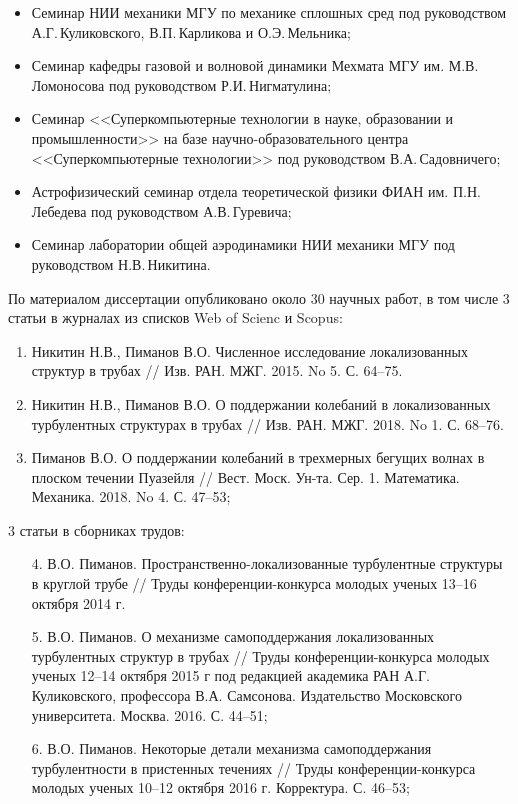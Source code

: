\begin{itemize}
\item Семинар НИИ механики МГУ по механике сплошных сред под руководством А.Г.\,Куликовского, В.П.\,Карликова и О.Э.\,Мельника;
\item Семинар кафедры газовой и волновой динамики Мехмата МГУ им. М.В. Ломоносова под руководством Р.И.\,Нигматулина;
\item Семинар <<Суперкомпьютерные технологии в науке, образовании и промышленности>> на базе научно-образовательного центра <<Суперкомпьютерные технологии>> под руководством В.А.\,Садовничего;
\item Астрофизический семинар отдела теоретической физики ФИАН им. П.Н.\,Лебедева под руководством А.В.\,Гуревича;
\item Семинар лаборатории общей аэродинамики НИИ механики МГУ под руководством Н.В.\,Никитина.
\end{itemize}
По материалом диссертации опубликовано около 30 научных работ, в том числе 3 статьи в журналах из списков Web of Scienc и Scopus:
\begin{enumerate}
\item Никитин Н.В., Пиманов В.О. Численное исследование локализованных структур в трубах // Изв. РАН. МЖГ. 2015. No 5. С. 64--75.
\item Никитин Н.В., Пиманов В.О. О поддержании колебаний в локализованных турбулентных структурах в трубах // Изв. РАН. МЖГ. 2018. No 1. С. 68--76.
\item Пиманов В.О. О поддержании колебаний в трехмерных бегущих волнах в плоском течении Пуазейля // Вест. Моск. Ун-та. Сер. 1. Математика. Механика. 2018. No 4. С. 47--53;
\end{enumerate}
3 статьи в сборниках трудов:
\begin{enumerate}
\item[4.] В.О. Пиманов. Пространственно-локализованные турбулентные структуры в круглой трубе // Труды конференции-конкурса молодых ученых 13--16 октября 2014 г.
\item[5.] В.О. Пиманов. О механизме самоподдержания локализованных турбулентных структур в трубах // Труды конференции-конкурса молодых ученых 12--14 октября 2015 г под редакцией академика РАН А.Г. Куликовского, профессора В.А. Самсонова. Издательство Московского университета. Москва. 2016. С. 44--51; 
\item[6.] В.О. Пиманов. Некоторые детали механизма самоподдержания турбулентности в пристенных течениях // Труды конференции-конкурса молодых ученых 10--12 октября 2016 г. Корректура. С. 46--53;
\end{enumerate} 
